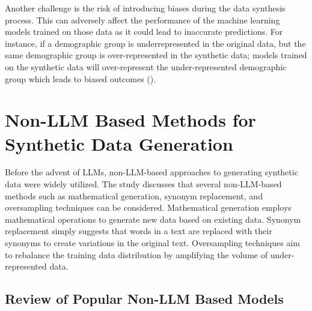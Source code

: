 \vspace{0.5cm}
Another challenge is the risk of introducing biases during the data synthesis process. This can adversely affect the performance of the machine learning models trained on those data as it could lead to inaccurate predictions. For instance, if a demographic group is underrepresented in the original data, but the same demographic group is over-represented in the synthetic data; models trained on the synthetic data will over-represent the under-represented demographic group which leads to biased outcomes (\cite{Mehrabi2019}). 



\section{Non-LLM Based Methods for Synthetic Data Generation}







Before the advent of LLMs, non-LLM-based approaches to generating synthetic data were widely utilized. The study \cite{Kruschwitz2024} discusses that several non-LLM-based methods such as mathematical generation, synonym replacement, and oversampling techniques can be considered. Mathematical generation employs mathematical operations to generate new data based on existing data. Synonym replacement simply suggests that words in a text are replaced with their synonyms to create variations in the original text. Oversampling techniques aim to rebalance the training data distribution by amplifying the volume of under-represented data.




\subsection{Review of Popular Non-LLM Based Models}

